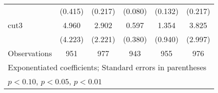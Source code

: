 \begin{table}[htbp]
\begin{tabular}{l*{5}{c}}
                &  (0.415)         &  (0.217)         &  (0.080)         &  (0.132)         &  (0.217)         \\
[1em]
cut3            &    4.960\sym{*}  &    2.902         &    0.597         &    1.354         &    3.825\sym{*}  \\
                &  (4.223)         &  (2.221)         &  (0.380)         &  (0.940)         &  (2.997)         \\
\hline
Observations    &      951         &      977         &      943         &      955         &      976         \\
\hline\hline
\multicolumn{6}{l}{\footnotesize Exponentiated coefficients; Standard errors in parentheses}\\
\multicolumn{6}{l}{\footnotesize \sym{*} \(p<0.10\), \sym{**} \(p<0.05\), \sym{***} \(p<0.01\)}\\
\end{tabular}
\end{table}

